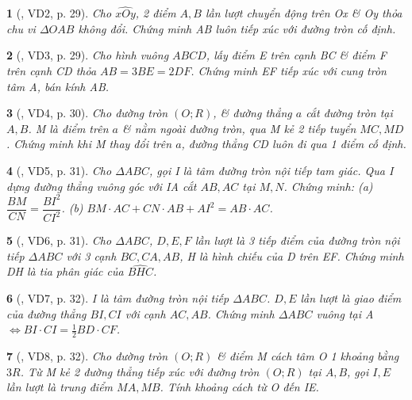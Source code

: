 \documentclass{article}
\newtheorem{baitoan}{}
\begin{document}
\begin{baitoan}[\cite{TLCT_THCS_Toan_9_hinh_hoc}, VD2, p. 29]
	Cho $\widehat{xOy}$, 2 điểm $A,B$ lần lượt chuyển động trên Ox \& Oy thỏa chu vi $\Delta OAB$ không đổi. Chứng minh AB luôn tiếp xúc với đường tròn cố định.
\end{baitoan}

\begin{baitoan}[\cite{TLCT_THCS_Toan_9_hinh_hoc}, VD3, p. 29]
	Cho hình vuông $ABCD$, lấy điểm E trên cạnh BC \& điểm F trên cạnh CD thỏa $AB = 3BE = 2DF$. Chứng minh EF tiếp xúc với cung tròn tâm A, bán kính AB.
\end{baitoan}

\begin{baitoan}[\cite{TLCT_THCS_Toan_9_hinh_hoc}, VD4, p. 30]
	Cho đường tròn $(O;R)$, \& đường thẳng $a$ cắt đường tròn tại $A,B$. M là điểm trên $a$ \& nằm ngoài đường tròn, qua M kẻ 2 tiếp tuyển $MC,MD$. Chứng minh khi M thay đổi trên $a$, đường thẳng CD luôn đi qua 1 điểm cố định.
\end{baitoan}

\begin{baitoan}[\cite{TLCT_THCS_Toan_9_hinh_hoc}, VD5, p. 31]
	Cho $\Delta ABC$, gọi I là tâm đường tròn nội tiếp tam giác. Qua I dựng đường thẳng vuông góc với IA cắt $AB,AC$ tại $M,N$. Chứng minh: (a) $\dfrac{BM}{CN} = \dfrac{BI^2}{CI^2}$. (b) $BM\cdot AC + CN\cdot AB + AI^2 = AB\cdot AC$.
\end{baitoan}

\begin{baitoan}[\cite{TLCT_THCS_Toan_9_hinh_hoc}, VD6, p. 31]
	Cho $\Delta ABC$, $D,E,F$ lần lượt là 3 tiếp điểm của đường tròn nội tiếp $\Delta ABC$ với 3 cạnh $BC,CA,AB$, H là hình chiếu của D trên EF. Chứng minh DH là tia phân giác của $\widehat{BHC}$.
\end{baitoan}

\begin{baitoan}[\cite{TLCT_THCS_Toan_9_hinh_hoc}, VD7, p. 32]
	I là tâm đường tròn nội tiếp $\Delta ABC$. $D,E$ lần lượt là giao điểm của đường thẳng $BI,CI$ với cạnh $AC,AB$. Chứng minh $\Delta ABC$ vuông tại A $\Leftrightarrow BI\cdot CI = \frac{1}{2}BD\cdot CF$.
\end{baitoan}

\begin{baitoan}[\cite{TLCT_THCS_Toan_9_hinh_hoc}, VD8, p. 32]
	Cho đường tròn $(O;R)$ \& điểm M cách tâm O 1 khoảng bằng $3R$. Từ M kẻ 2 đường thẳng tiếp xúc với đường tròn $(O;R)$ tại $A,B$, gọi $I,E$ lần lượt là trung điểm $MA,MB$. Tính khoảng cách từ O đến IE.
\end{baitoan}
\end{document}
